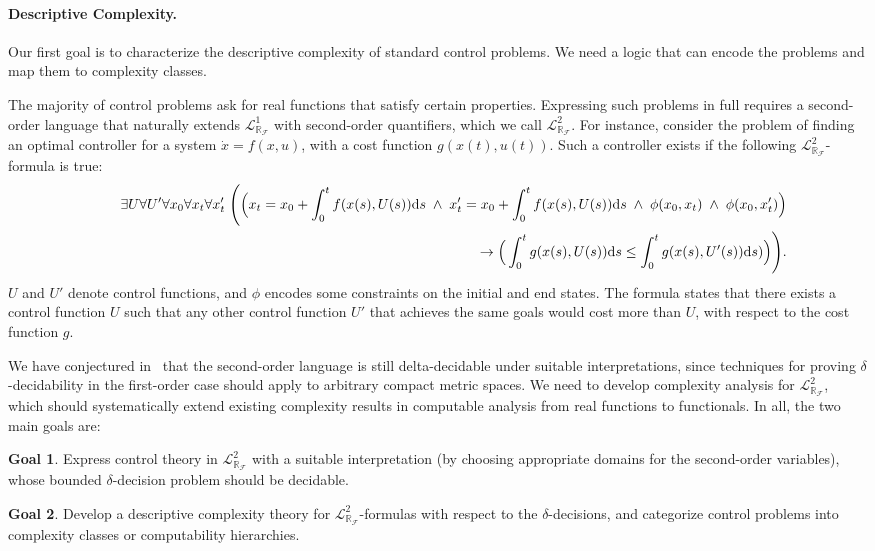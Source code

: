\documentclass[10pt]{article}
\newcommand{\lrf}{\mathcal{L}_{\mathbb{R}_{\mathcal{F}}}}
\theoremstyle{definition}
\newtheorem{goal}{Goal}
\begin{document}
\paragraph{Descriptive Complexity.}
Our first goal is to characterize the descriptive complexity of standard control problems. We need a logic that can encode the problems and map them to complexity classes. 

The majority of control problems ask for real functions that satisfy certain properties. Expressing such problems in full requires a second-order language that naturally extends $\lrf^1$ with second-order quantifiers, which we call $\lrf^2$. For instance, consider the problem of finding an optimal controller for a system $\dot x = f({x}, u)$, with a cost function $g(x(t),u(t))$. Such a controller exists if the following $\lrf^2$-formula is true:
\begin{eqnarray*}
& &\exists U \forall U' \forall {x_0}\forall {x_t} \forall {x_t'} \;\Bigg( \Big({x_t} = {x_0} + \int_{0}^t f({x}(s),U(s))\mathrm{d}s \;\wedge\;  x_t' = x_0 + \int_{0}^t f(x(s),U(s))\mathrm{d}s
\;\wedge\; \phi(x_0, x_t) \;\wedge\; \phi(x_0, x_t')\Big)\\
& &\hspace{9.5cm} \rightarrow \Big(\int_0^t g(x(s),U(s))\mathrm{d}s \leq  \int_0^t g(x(s),U'(s))\mathrm{d}s)\Big) \Bigg).
\end{eqnarray*}
$U$ and $U'$ denote control functions, and $\phi$ encodes some constraints on the initial and end states. The formula states that there exists a control function $U$ such that any other control function $U'$ that achieves the same goals would cost more than $U$, with respect to the cost function $g$. 

We have conjectured in~\cite{DBLP:conf/lics/GaoAC12} that the second-order language is still delta-decidable under suitable interpretations, since techniques for proving $\delta$-decidability in the first-order case should apply to arbitrary compact metric spaces. We need to develop complexity analysis for $\lrf^2$, which should systematically extend existing complexity results in computable analysis from real functions to functionals. In all, the two main goals are:
\begin{goal}
Express control theory in $\mathcal{L}^2_{\mathbb{R}_{\mathcal{F}}}$ with a suitable interpretation (by choosing appropriate domains for the second-order variables), whose bounded $\delta$-decision problem should be decidable.
\end{goal}
\begin{goal}
Develop a descriptive complexity theory for $\lrf^2$-formulas with respect to the $\delta$-decisions, and categorize control problems into complexity classes or computability hierarchies.
\end{goal}
\end{document}
